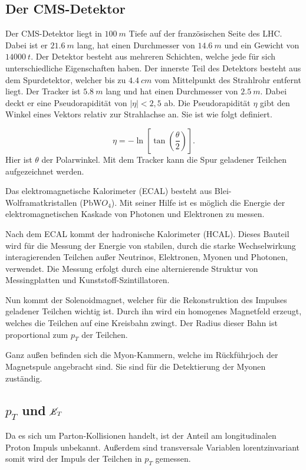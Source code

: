\documentclass[a4paper]{article}
\begin{document}
\subsection{Der CMS-Detektor} 
Der CMS-Detektor liegt in $\SI{100}{m}$ Tiefe auf der französischen Seite des LHC. Dabei ist er $\SI{21.6}{m}$ lang, hat einen Durchmesser von $\SI{14.6}{m}$ und ein Gewicht von $\SI{14 000}{t}$. Der Detektor besteht aus mehreren Schichten, welche jede für sich unterschiedliche Eigenschaften haben. Der innerste Teil des Detektors besteht aus dem Spurdetektor, welcher bis zu $\SI{4,4}{cm}$ vom Mittelpunkt des Strahlrohr entfernt liegt. Der Tracker ist $\SI{5,8}{m}$ lang und hat einen Durchmesser von $\SI{2,5}{m}$. Dabei deckt er eine Pseudorapidität von $|\eta| < 2,5$ ab. Die Pseudorapidität $\eta$ gibt den Winkel eines Vektors relativ zur Strahlachse an. Sie ist wie folgt definiert.

\begin{equation}
\eta =-\ln \left[\tan \left({\frac {\theta}{2}}\right)\right].
\end{equation}
Hier ist $\theta$ der Polarwinkel. Mit dem Tracker kann die Spur geladener Teilchen aufgezeichnet werden. 

Das elektromagnetische Kalorimeter (ECAL) besteht aus Blei-Wolframatkristallen (PbW$O_4$). Mit seiner Hilfe ist es möglich die Energie der elektromagnetischen Kaskade von Photonen und Elektronen zu messen. 

Nach dem ECAL kommt der hadronische Kalorimeter (HCAL). Dieses Bauteil wird für die Messung der Energie von stabilen, durch die starke Wechselwirkung interagierenden Teilchen außer Neutrinos, Elektronen, Myonen und Photonen, verwendet. Die Messung erfolgt durch eine alternierende Struktur von Messingplatten und Kunststoff-Szintillatoren.

Nun kommt der Solenoidmagnet, welcher für die Rekonstruktion des Impulses geladener Teilchen wichtig ist. Durch ihn wird ein homogenes Magnetfeld erzeugt, welches die Teilchen auf eine Kreisbahn zwingt. Der Radius dieser Bahn ist proportional zum $p_T$ der Teilchen. 

Ganz außen befinden sich die Myon-Kammern, welche im Rückführjoch der Magnetspule angebracht sind. Sie sind für die Detektierung der Myonen zuständig.

\subsection{$p_T$ und $\cancel{\it{E}}_{T}$}
Da es sich um Parton-Kollisionen handelt, ist der Anteil am longitudinalen Proton Impuls unbekannt. Außerdem sind transversale Variablen lorentzinvariant somit wird der Impuls der Teilchen in $p_T$ gemessen. 
\end{document}
